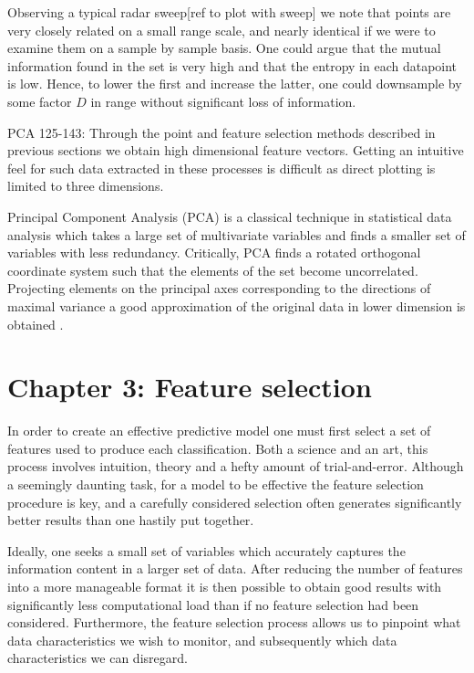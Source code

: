 \documentclass[a4paper, 12pt]{article}
\begin{document}
Observing a typical radar sweep[ref to plot with sweep] we note that points are very closely related on a small range scale, and nearly identical if we were to examine them on a sample by sample basis. One could argue that the mutual information found in the set is very high and that the entropy in each datapoint is low. Hence, to lower the first and increase the latter, one could downsample by some factor $D$ in range without significant loss of information.


PCA 125-143: Through the point and feature selection methods described in previous sections we obtain high dimensional feature vectors. Getting an intuitive feel for such data extracted in these processes is difficult as direct plotting is limited to three dimensions. 

Principal Component Analysis (PCA) is  a classical technique in statistical data analysis which takes a large set of multivariate variables and finds a smaller set of variables with less redundancy. Critically, PCA finds a rotated orthogonal coordinate system such that the elements of the set become uncorrelated. Projecting elements on the principal axes corresponding to the directions of maximal variance a good approximation of the original data in lower dimension is obtained \citep{hyvasrinen_karhunen_oja_2004}. 

\section{Chapter 3: Feature selection}

In order to create an effective predictive model one must first select a set of features used to produce each classification. Both a science and an art, this process involves intuition, theory and a hefty amount of trial-and-error. Although a seemingly daunting task, for a model to be effective the feature selection procedure is key, and a carefully considered selection often generates significantly better results than one hastily put together. 

Ideally, one seeks a small set of variables which accurately captures the information content in a larger set of data. After reducing the number of features into a more manageable format it is then possible to obtain good results with significantly less computational load than if no feature selection had been considered. Furthermore, the feature selection process allows us to pinpoint what data characteristics we wish to monitor, and subsequently which data characteristics we can disregard. 
\end{document}

